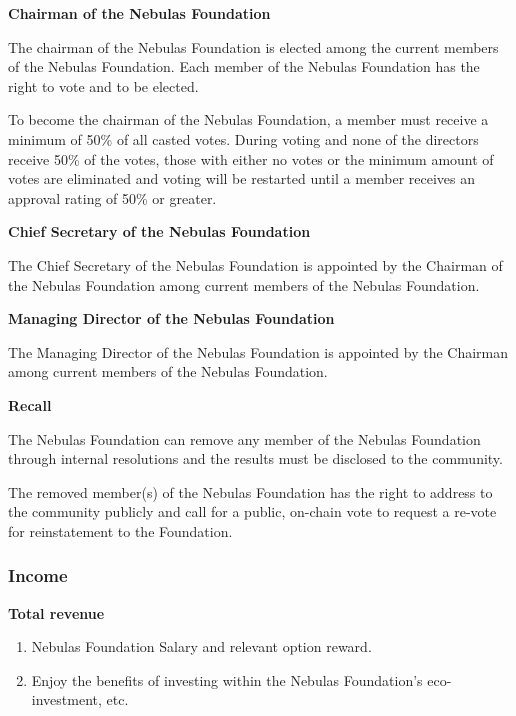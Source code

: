 \vspace{2em}

\textbf{Chairman of the Nebulas Foundation}

The chairman of the Nebulas Foundation is elected among the current members of the Nebulas Foundation. Each member of the Nebulas Foundation has the right to vote and to be elected.

To become the chairman of the Nebulas Foundation, a member must receive a minimum of 50\% of all casted votes. During voting and none of the directors receive 50\% of the votes, those with either no votes or the minimum amount of votes are eliminated and voting will be restarted until a member receives an approval rating of 50\% or greater.

\vspace{2em}

\textbf{Chief Secretary of the Nebulas Foundation}

The Chief Secretary of the Nebulas Foundation is appointed by the Chairman of the Nebulas Foundation among current members of the Nebulas Foundation.

\vspace{2em}

\textbf{Managing Director of the Nebulas Foundation}

The Managing Director of the Nebulas Foundation is appointed by the Chairman among current members of the Nebulas Foundation.

\vspace{2em}

\textbf{Recall}

The Nebulas Foundation can remove any member of the Nebulas Foundation through internal resolutions and the results must be disclosed to the community.

The removed member(s) of the Nebulas Foundation has the right to address to the community publicly and call for a public, on-chain vote to request a re-vote for reinstatement to the Foundation.

\subsubsection{Income}

\textbf{Total revenue}

\begin{enumerate}
	\item Nebulas Foundation Salary and relevant option reward.
    \item Enjoy the benefits of investing within the Nebulas Foundation’s eco-investment, etc.
\end{enumerate}

